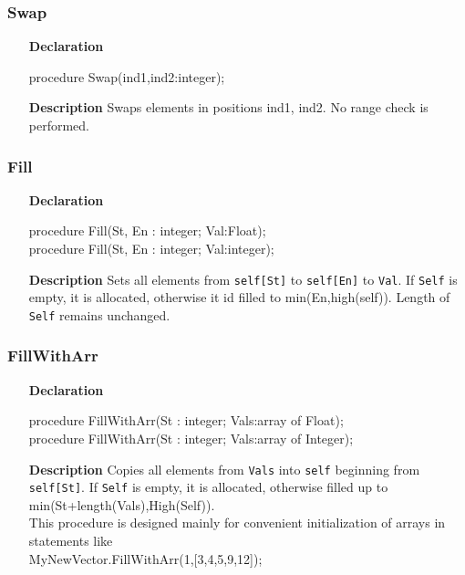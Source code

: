 \documentclass[12pt,a4paper,oneside]{report}
\newcommand{\declarationitem}[1]{\textbf{#1}}
\newcommand{\descriptiontitle}[1]{\textbf{#1}}
\newcommand{\code}[1]{\texttt{#1}}
\begin{document}
\subsubsection{Swap}
\begin{itemize}
	\item[\declarationitem{Declaration}\hfill]
	\begin{flushleft}
     procedure Swap(ind1,ind2:integer);
	\end{flushleft}
	\item[\descriptiontitle{Description}\hfill]
	Swaps elements in positions ind1, ind2. No range check is performed.
\end{itemize}
\subsubsection{Fill}
\begin{itemize}
	\item[\declarationitem{Declaration}\hfill]
	\begin{flushleft}
		     procedure Fill(St, En : integer; Val:Float);\\ \vspace{4pt}
		     procedure Fill(St, En : integer; Val:integer);
	\end{flushleft}
	\item[\descriptiontitle{Description}\hfill]
	Sets all elements from \code{self[St]} to \code{self[En]} to \code{Val}. If \code{Self} is empty, it is allocated, otherwise it id filled to min(En,high(self)). Length of \code{Self} remains unchanged.
\end{itemize}
\subsubsection{FillWithArr}
\begin{itemize}
	\item[\declarationitem{Declaration}\hfill]
	\begin{flushleft}
		procedure FillWithArr(St : integer; Vals:array of Float);\\ \vspace{4pt}
		procedure FillWithArr(St : integer; Vals:array of Integer);
	\end{flushleft}
	\item[\descriptiontitle{Description}\hfill]
	Copies all elements from \code{Vals} into \code{self} beginning from \code{self[St]}. If \code{Self} is empty, it is allocated, otherwise filled up to \\ min(St+length(Vals),High(Self)). \\ This procedure is designed mainly for convenient initialization of arrays in statements like \\ 
	MyNewVector.FillWithArr(1,[3,4,5,9,12]);
\end{itemize}
\end{document}
